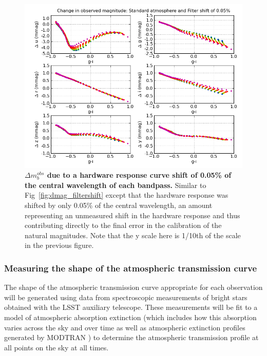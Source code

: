 \documentclass[12pt,preprint]{aastex}
\begin{document}
\begin{figure}
\centering
\includegraphics[width=6in]{delta_mags_filtershift_small}
\caption{{\small 
{\bf $\Delta m_b^{obs}$ due to a hardware
response curve shift of 0.05\% of the central wavelength of each
bandpass.} Similar to Fig~\ref{fig:dmag_filtershift} except that the
hardware response was shifted by only 0.05\% of the central
wavelength, an amount representing an unmeasured shift in the hardware
response and thus contributing directly to the final error in the
calibration of the natural magnitudes. Note that the y scale here is 1/10th
of the scale in the previous figure. }}
\label{fig:dmag_filtershift_small} 
\end{figure}
 

\subsubsection{Measuring the shape of the atmospheric transmission curve}
\label{sec:atmo_phi}

The shape of the atmospheric transmission curve appropriate for each observation
will be generated using data from spectroscopic measurements of bright
stars obtained with the LSST auxiliary telescope. These measurements
will be fit to a model of atmospheric absorption extinction (which includes
how this absorption varies across the sky and over time as well as
atmospheric extinction profiles generated by MODTRAN \citep{modtran4a,
  modtran4b}) to determine
the atmospheric transmission profile at all points on the sky at all
times. 
\end{document}
